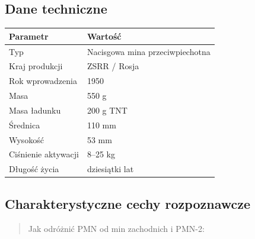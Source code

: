 \documentclass[12pt,oneside]{book}
\begin{document}
\subsection{Dane techniczne}\label{dane-techniczne-122}

\begin{longtable}[]{@{}ll@{}}
\toprule\noalign{}
Parametr & Wartość \\
\midrule\noalign{}
\endhead
\bottomrule\noalign{}
\endlastfoot
Typ & Nacisgowa mina przeciwpiechotna \\
Kraj produkcji & ZSRR / Rosja \\
Rok wprowadzenia & 1950 \\
Masa & 550 g \\
Masa ładunku & 200 g TNT \\
Średnica & 110 mm \\
Wysokość & 53 mm \\
Ciśnienie aktywacji & 8--25 kg \\
Długość życia & dziesiątki lat \\
\end{longtable}

\subsection{Charakterystyczne cechy
rozpoznawcze}\label{charakterystyczne-cechy-rozpoznawcze-122}

\begin{quote}
Jak odróżnić PMN od min zachodnich i PMN-2:
\end{quote}
\end{document}
